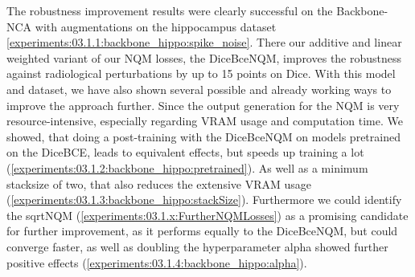 The robustness improvement results were clearly successful on the Backbone-NCA with augmentations on the hippocampus dataset \autoref{experiments:03.1.1:backbone_hippo:spike_noise}. There our additive and linear weighted variant of our NQM losses, the DiceBceNQM, improves the robustness against radiological perturbations by up to 15 points on Dice. With this model and dataset, we have also shown several possible and already working ways to improve the approach further. Since the output generation for the NQM is very resource-intensive, especially regarding VRAM usage and computation time. We showed, that doing a post-training with the DiceBceNQM on models pretrained on the DiceBCE, leads to equivalent effects, but speeds up training a lot (\autoref{experiments:03.1.2:backbone_hippo:pretrained}). As well as a minimum stacksize of two, that also reduces the extensive VRAM usage (\autoref{experiments:03.1.3:backbone_hippo:stackSize}). 
Furthermore we could identify the sqrtNQM (\autoref{experiments:03.1.x:FurtherNQMLosses}) as a promising candidate for further improvement, as it performs equally to the DiceBceNQM, but could converge faster, as well as doubling the hyperparameter alpha showed further positive effects (\autoref{experiments:03.1.4:backbone_hippo:alpha}).

